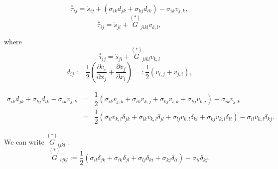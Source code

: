 \begin{equation}\nonumber
\stackrel{*}{\tau}_{ij}=\dot{s}_{ij}+\left(\sigma_{ik}d_{jk}+\sigma_{kj}d_{ik}\right)-\sigma_{ik}v_{j,k},
\end{equation}
\begin{equation}\nonumber
\stackrel{*}{\tau}_{ij}=\dot{s}_{ji}+\stackrel{(*)}{G}_{jikl}v_{k,l},
\end{equation}

where 
\begin{equation}\nonumber
\stackrel{*}{\tau}_{ij}=\dot{s}_{ji}+\stackrel{(*)}{G}_{jikl}v_{k,l}
\end{equation}
\begin{equation}\nonumber
d_{ij}:=\dfrac{1}{2}\left(\dfrac{\partial v_i}{\partial x_j}+\dfrac{\partial v_j}{\partial x_i}\right)=:\dfrac{1}{2}(v_{i,j}+v_{j,i}),
\end{equation}

\begin{eqnarray}
\sigma_{ik}d_{jk}+\sigma_{kj}d_{ik}-\sigma_{ik}v_{j,k} &=& \dfrac{1}{2}\left(\sigma_{ik}v_{j,k}+\sigma_{ik}v_{k,j}+\sigma_{kj}v_{i,k}+\sigma_{kj}v_{k,i}\right)-\sigma_{ik}v_{j,k} \nonumber \\
&=& \dfrac{1}{2}\left(\sigma_{il}v_{k,l}\delta_{jk}+\sigma_{ik}v_{k,l}\delta_{jl}+\sigma_{lj}v_{k,l}\delta_{ki}+\sigma_{kj}v_{k,l}\delta_{li}\right)-\sigma_{il}v_{k,l}\delta_{kj}. \nonumber
\end{eqnarray}

We can write $\stackrel{(*)}{G}_{ijkl}$ :
\begin{equation}\nonumber
\stackrel{(*)}{G}_{ijkl}:=\dfrac{1}{2}\left(\sigma_{il}\delta_{jk}+\sigma_{ik}\delta_{jl}+\sigma_{lj}\delta_{ki}+\sigma_{kj}\delta_{li}\right)-\sigma_{il}\delta_{kj}.
\end{equation}

